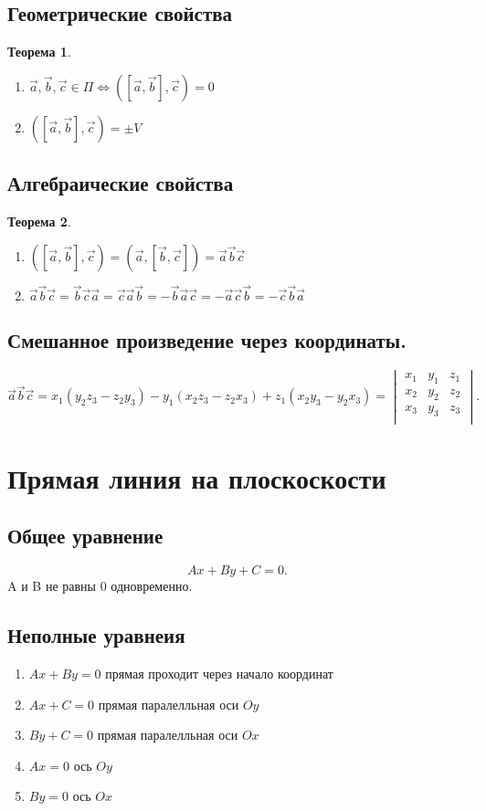 \documentclass{scrartcl}
\newtheorem{theorem}{Теорема}
\begin{document}
    \subsection{Геометрические свойства}
    \begin{theorem}
        \begin{enumerate}
            \item  $\vec{a},\vec{b},\vec{c} \in \Pi \iff ([\vec{a},\vec{b}],\vec{c}) = 0$
            \item $([\vec{a},\vec{b}],\vec{c}) = \pm V$
        \end{enumerate}
    \end{theorem}
    \subsection{Алгебраические свойства}
    \begin{theorem}
        \begin{enumerate}
            \item $([\vec{a},\vec{b}],\vec{c}) = (\vec{a},[\vec{b},\vec{c}]) = \vec{a}\vec{b}\vec{c}$
                \item $\vec{a}\vec{b}\vec{c} = \vec{b}\vec{c}\vec{a} = \vec{c}\vec{a}\vec{b} = -\vec{b}\vec{a}\vec{c} = -\vec{a}\vec{c}\vec{b} = -\vec{c}\vec{b}\vec{a}$
        \end{enumerate}
    \end{theorem}
    \subsection{Смешанное произведение через координаты.}
    \[
    \vec{a}\vec{b}\vec{c} = x_1(y_2z_3 - z_2y_3) - y_1(x_2z_3 -z_2x_3) + z_1(x_2y_3-y_2x_3) = 
    \begin{vmatrix} 
        x_1 & y_1 & z_1 \\
        x_2 & y_2 & z_2 \\
        x_3 & y_3 & z_3\\
    \end{vmatrix} 
    .\] 
    \section{Прямая линия на плоскоскости}
    \subsection{Общее уравнение}
    \[
    Ax + By + C = 0
    .\] 
    A и B не равны 0 одновременно.
    \subsection{Неполные уравнеия}
    \begin{enumerate}
        \item $Ax + By = 0$ прямая проходит через начало координат
        \item  $Ax + C = 0$ прямая паралелльная оси  $Oy$
        \item  $By + C = 0$ прямая паралелльная оси  $Ox$
        \item  $Ax = 0$ ось  $Oy$
        \item  $By = 0$ ось  $Ox$
    \end{enumerate}
\end{document}
